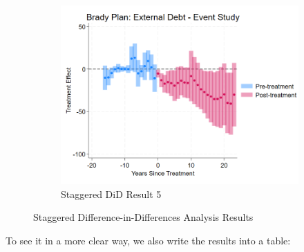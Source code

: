 \begin{figure}[ht!]
\begin{subfigure}[b]{0.48\textwidth}
        \centering
        \includegraphics[width=\textwidth]{figures/CS_Brady_ExtDebt_EventStudy.png}
        \caption{Staggered DiD Result 5}
        \label{fig:stag5}
    \end{subfigure}
    \caption{Staggered Difference-in-Differences Analysis Results}
    \label{fig:staggered_did}
\end{figure}

To see it in a more clear way, we also write the results into a table:



